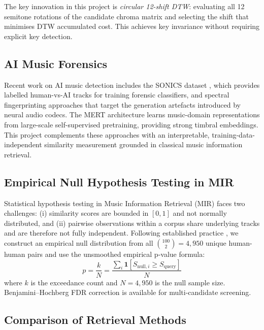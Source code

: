 \documentclass[12pt,a4paper]{article}
\begin{document}
The key innovation in this project is \emph{circular 12-shift DTW}: evaluating
all 12 semitone rotations of the candidate chroma matrix and selecting the
shift that minimises DTW accumulated cost. This achieves key invariance without
requiring explicit key detection.

\subsection{AI Music Forensics}

Recent work on AI music detection includes the SONICS dataset
\cite{yuan2024sonics}, which provides labelled human-vs-AI tracks for training
forensic classifiers, and spectral fingerprinting approaches
\cite{pasini2022musika} that target the generation artefacts introduced by
neural audio codecs. The MERT architecture \cite{li2023mert} learns
music-domain representations from large-scale self-supervised pretraining,
providing strong timbral embeddings. This project complements these approaches
with an interpretable, training-data-independent similarity measurement grounded
in classical music information retrieval.

\subsection{Empirical Null Hypothesis Testing in MIR}

Statistical hypothesis testing in Music Information Retrieval (MIR) faces two
challenges: (i) similarity scores are bounded in $[0, 1]$ and not normally
distributed, and (ii) pairwise observations within a corpus share underlying
tracks and are therefore not fully independent. Following established practice
\cite{muller2015fundamentals}, we construct an empirical null distribution from
all $\binom{100}{2} = 4{,}950$ unique human-human pairs and use the unsmoothed
empirical p-value formula:
\[
  p = \frac{k}{N} = \frac{\sum_{i} \mathbf{1}[S_{\mathrm{null},i} \geq S_{\mathrm{query}}]}{N}
\]
where $k$ is the exceedance count and $N = 4{,}950$ is the null sample size.
Benjamini--Hochberg FDR correction \cite{benjamini1995controlling} is available
for multi-candidate screening.

\subsection{Comparison of Retrieval Methods}
\end{document}
